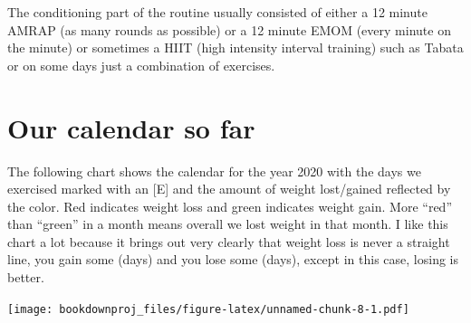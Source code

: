 \documentclass[
  oneside]{book}
\begin{document}
\begin{table}[H]
\centering
{}
\end{table}

The conditioning part of the routine usually consisted of either a 12 minute AMRAP (as many rounds as possible) or a 12 minute EMOM (every minute on the minute) or sometimes a HIIT (high intensity interval training) such as Tabata or on some days just a combination of exercises.

\hypertarget{our-calendar-so-far}{%
\section{Our calendar so far}\label{our-calendar-so-far}}

The following chart shows the calendar for the year 2020 with the days we exercised marked with an {[}E{]} and the amount of weight lost/gained reflected by the color. Red indicates weight loss and green indicates weight gain. More ``red'' than ``green'' in a month means overall we lost weight in that month. I like this chart a lot because it brings out very clearly that weight loss is never a straight line, you gain some (days) and you lose some (days), except in this case, losing is better.

\texttt{[image: bookdownproj\_files/figure-latex/unnamed-chunk-8-1.pdf]}
\end{document}
